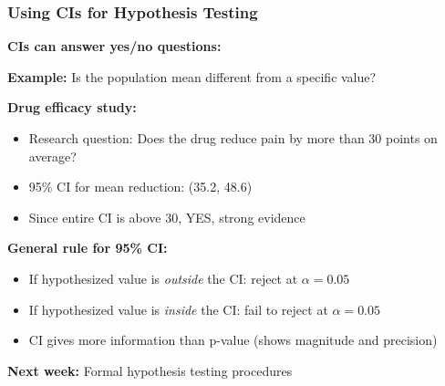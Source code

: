 \documentclass{beamer}
\begin{document}
\begin{frame}
\frametitle{Using CIs for Hypothesis Testing}
\textbf{CIs can answer yes/no questions:}

\vspace{0.3cm}
\textbf{Example:} Is the population mean different from a specific value?

\vspace{0.3cm}
\textbf{Drug efficacy study:}
\begin{itemize}
\item Research question: Does the drug reduce pain by more than 30 points on average?
\item 95\% CI for mean reduction: (35.2, 48.6)
\item Since entire CI is above 30, YES, strong evidence
\end{itemize}

\vspace{0.5cm}
\textbf{General rule for 95\% CI:}
\begin{itemize}
\item If hypothesized value is \textit{outside} the CI: reject at $\alpha = 0.05$
\item If hypothesized value is \textit{inside} the CI: fail to reject at $\alpha = 0.05$
\item CI gives more information than p-value (shows magnitude and precision)
\end{itemize}

\vspace{0.3cm}
\textbf{Next week:} Formal hypothesis testing procedures
\end{frame}
\end{document}

